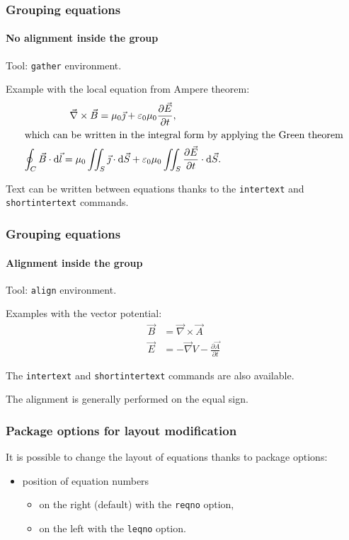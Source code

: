 \documentclass[11pt]{beamer}
\begin{document}
\begin{frame}
	\frametitle{Grouping equations}
	\framesubtitle{No alignment inside the group}
	
	Tool: \texttt{gather} environment.
	
	Example with the local equation from Ampere theorem:
	\begin{gather}
		\vec{\nabla} \times \vec{B}
			= \mu_0 \vec{\jmath}
			+ \varepsilon_0 \mu_0 \frac{\partial \vec{E}}{\partial t}, \\
		\intertext{which can be written in the integral form by applying the Green theorem}
		\oint_{C} \vec{B} \cdot \mathrm{d} \vec{l}
			= \mu_0 \iint_S \vec{\jmath} \cdot \mathrm{d} \vec{S}
			+ \varepsilon_0 \mu_0 \iint_S \frac{\partial \vec{E}}{\partial t} \cdot \mathrm{d} \vec{S}.
	\end{gather}
	
	Text can be written between equations thanks to the \texttt{intertext} and \texttt{shortintertext} commands.
\end{frame}

\begin{frame}
	\frametitle{Grouping equations}
	\framesubtitle{Alignment inside the group}
	
	Tool: \texttt{align} environment.
	
	Examples with the vector potential:
	\begin{align}
		\vec{B} &= \vec{\nabla} \times \vec{A} \\
		\vec{E} &= -\vec{\nabla} V - \frac{\partial \vec{A}}{\partial t}
	\end{align}
	
	 The \texttt{intertext} and \texttt{shortintertext} commands are also available.
	 
	 The alignment is generally performed on the equal sign.
\end{frame}


\begin{frame}
	\frametitle{Package options for layout modification}

	It is possible to change the layout of equations thanks to package options:
	\begin{itemize}
		\item position of equation numbers
		\begin{itemize}
			\item on the right (default) with the \texttt{reqno} option,
			\item on the left with the \texttt{leqno} option.
		\end{itemize}
	\end{itemize}
\end{frame}


\end{document}
